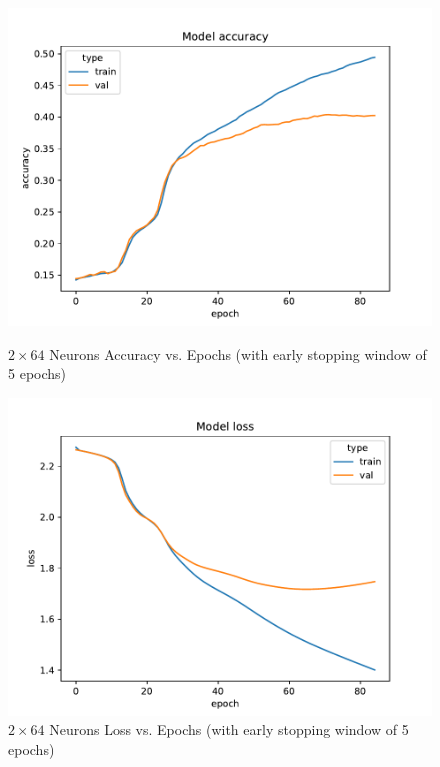 \documentclass{article}
\begin{document}
    \begin{figure}[H]
        \begin{minipage}[b]{0.5\linewidth}
            \centering
            \includegraphics[width=\textwidth]{../plots/config_2f_thin_accuracy}
            \caption{$2 \times 64$ Neurons Accuracy vs. Epochs (with early stopping window of 5 epochs)}
            \label{fig:figure19}
        \end{minipage}
        \hspace{0.2cm}
        \begin{minipage}[b]{0.5\linewidth}
            \centering
            \includegraphics[width=\textwidth]{../plots/config_2f_thin_loss}
            \caption{$2 \times 64$ Neurons Loss vs. Epochs (with early stopping window of 5 epochs)}
            \label{fig:figure20}
        \end{minipage}
    \end{figure}
\end{document}
